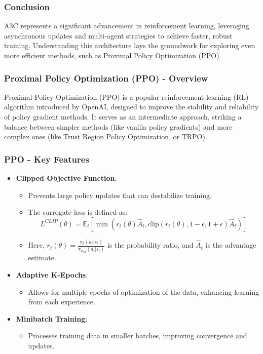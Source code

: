 \documentclass{beamer}
\begin{document}
\begin{frame}
    \frametitle{Conclusion}
    A3C represents a significant advancement in reinforcement learning, leveraging asynchronous updates and multi-agent strategies to achieve faster, robust training. Understanding this architecture lays the groundwork for exploring even more efficient methods, such as Proximal Policy Optimization (PPO).
\end{frame}

\begin{frame}[fragile]
    \frametitle{Proximal Policy Optimization (PPO) - Overview}
    Proximal Policy Optimization (PPO) is a popular reinforcement learning (RL) algorithm introduced by OpenAI, designed to improve the stability and reliability of policy gradient methods. It serves as an intermediate approach, striking a balance between simpler methods (like vanilla policy gradients) and more complex ones (like Trust Region Policy Optimization, or TRPO).
\end{frame}

\begin{frame}[fragile]
    \frametitle{PPO - Key Features}
    \begin{itemize}
        \item \textbf{Clipped Objective Function}:
        \begin{itemize}
            \item Prevents large policy updates that can destabilize training. 
            \item The surrogate loss is defined as:
            \begin{equation}
                L^{CLIP}(\theta) = \mathbb{E}_t \left[ \min\left( r_t(\theta) \hat{A}_t, \text{clip}(r_t(\theta), 1 - \epsilon, 1 + \epsilon) \hat{A}_t \right) \right]
            \end{equation}
            \item Here, \( r_t(\theta) = \frac{\pi_\theta(a_t | s_t)}{\pi_{\theta_{\text{old}}}(a_t | s_t)} \) is the probability ratio, and \( \hat{A}_t \) is the advantage estimate.
        \end{itemize}
        
        \item \textbf{Adaptive K-Epochs}:
        \begin{itemize}
            \item Allows for multiple epochs of optimization of the data, enhancing learning from each experience.
        \end{itemize}
        
        \item \textbf{Minibatch Training}:
        \begin{itemize}
            \item Processes training data in smaller batches, improving convergence and updates.
        \end{itemize}
    \end{itemize}
\end{frame}
\end{document}

